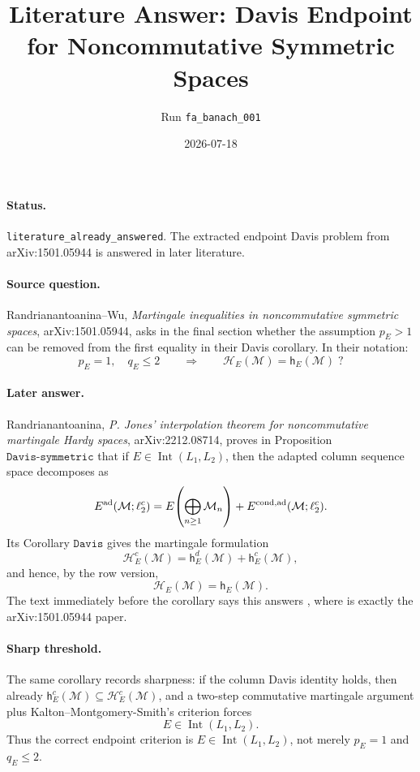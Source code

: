 \documentclass[11pt]{article}
\title{Literature Answer: Davis Endpoint for Noncommutative Symmetric Spaces}
\author{Run \texttt{fa\_banach\_001}}
\date{2026-07-18}
\newcommand{\M}{\mathcal M}
\newcommand{\Hc}{\mathcal H}
\newcommand{\hc}{\mathsf h}
\newcommand{\Int}{\operatorname{Int}}
\begin{document}
\maketitle

\paragraph{Status.}
\texttt{literature\_already\_answered}. The extracted endpoint Davis problem
from arXiv:1501.05944 is answered in later literature.

\paragraph{Source question.}
Randrianantoanina--Wu, \emph{Martingale inequalities in noncommutative
symmetric spaces}, arXiv:1501.05944, asks in the final section whether the
assumption \(p_E>1\) can be removed from the first equality in their Davis
corollary. In their notation:
\[
  p_E=1,\quad q_E\le 2
  \qquad\Longrightarrow\qquad
  \Hc_E(\M)=\hc_E(\M)\;?
\]

\paragraph{Later answer.}
Randrianantoanina, \emph{P. Jones' interpolation theorem for noncommutative
martingale Hardy spaces}, arXiv:2212.08714, proves in Proposition
\(\texttt{Davis-symmetric}\) that if \(E\in\Int(L_1,L_2)\), then the adapted
column sequence space decomposes as
\[
  E^{\rm ad}(\M;\ell_2^c)
  =
  E\!\left(\bigoplus_{n\ge1}\M_n\right)
  + E^{\rm cond,ad}(\M;\ell_2^c).
\]
Its Corollary \(\texttt{Davis}\) gives the martingale formulation
\[
  \Hc_E^c(\M)=\hc_E^d(\M)+\hc_E^c(\M),
\]
and hence, by the row version,
\[
  \Hc_E(\M)=\hc_E(\M).
\]
The text immediately before the corollary says this answers
\cite[Problem~4.2]{RW}, where \cite{RW} is exactly the arXiv:1501.05944
paper.

\paragraph{Sharp threshold.}
The same corollary records sharpness: if the column Davis identity holds, then
already \(\hc_E^c(\M)\subseteq \Hc_E^c(\M)\), and a two-step commutative
martingale argument plus Kalton--Montgomery-Smith's criterion forces
\[
  E\in\Int(L_1,L_2).
\]
Thus the correct endpoint criterion is \(E\in\Int(L_1,L_2)\), not merely
\(p_E=1\) and \(q_E\le2\).
\end{document}
